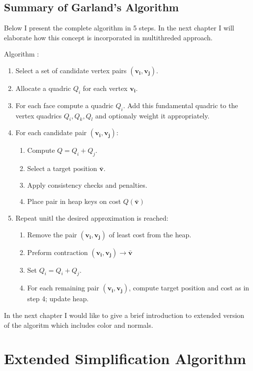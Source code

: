 \section{Summary of Garland's Algorithm}

Below I present the complete algorithm in 5 steps. In the next chapter I will elaborate how this concept is incorporated in multithreded approach.

Algorithm \cite{garland99}:

\begin{enumerate}
\item Select a set of candidate vertex pairs $(\mathbf{v_i}, \mathbf{v_j})$.
\item Allocate a quadric $Q_i$ for each vertex $\mathbf{v_i}$.
\item For each face compute a quadric $Q_i$. Add this fundamental quadric to the vertex quadrics $Q_i, Q_k, Q_l$ and optionaly weight it appropriately.
\item For each candidate pair $(\mathbf{v_i}, \mathbf{v_j})$:
\begin{enumerate}
\item Compute $Q = Q_i + Q_j$.
\item Select a target position $\mathbf{\bar{v}}$.
\item Apply consistency checks and penalties.
\item Place pair in heap keys on cost $Q(\mathbf{\bar{v}})$
\end{enumerate}
\item Repeat unitl the desired approximation is reached:
\begin{enumerate}
\item Remove the pair $(\mathbf{v_i}, \mathbf{v_j})$ of least cost from the heap.
\item Preform contraction $(\mathbf{v_i}, \mathbf{v_j})\rightarrow\bar{\mathbf{v}}$
\item Set $Q_i = Q_i + Q_j$.
\item For each remaining pair $(\mathbf{v_i}, \mathbf{v_j})$, compute target position and cost as in step 4; update heap.
\end{enumerate}
\end{enumerate}

In the next chapter I would like to give a brief introduction to extended version of the algoritm which includes color and normals.

\chapter{Extended Simplification Algorithm}

